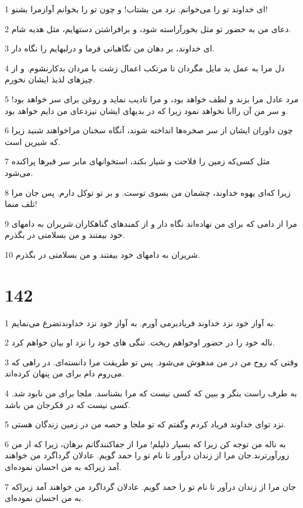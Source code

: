 \par 1 ای خداوند تو را می‌خوانم. نزد من بشتاب! و چون تو را بخوانم آوازمرا بشنو!
\par 2 دعای من به حضور تو مثل بخورآراسته شود، و برافراشتن دستهایم، مثل هدیه شام.
\par 3 ‌ای خداوند، بر دهان من نگاهبانی فرما و درلبهایم را نگاه دار.
\par 4 دل مرا به عمل بد مایل مگردان تا مرتکب اعمال زشت با مردان بدکارنشوم. و از چیزهای لذیذ ایشان نخورم.
\par 5 مرد عادل مرا بزند و لطف خواهد بود، و مرا تادیب نماید و روغن برای سر خواهد بود! و سر من آن راابا نخواهد نمود زیرا که در بدیهای ایشان نیزدعای من دایم خواهد بود.
\par 6 چون داوران ایشان از سر صخره‌ها انداخته شوند، آنگاه سخنان مراخواهند شنید زیرا که شیرین است.
\par 7 مثل کسی‌که زمین را فلاحت و شیار بکند، استخوانهای مابر سر قبرها پراکنده می‌شود.
\par 8 زیرا که‌ای یهوه خداوند، چشمان من بسوی توست. و بر تو توکل دارم. پس جان مرا تلف منما!
\par 9 مرا از دامی که برای من نهاده‌اند نگاه دار و از کمندهای گناهکاران.شریران به دامهای خود بیفتند و من بسلامتی در بگذرم.
\par 10 شریران به دامهای خود بیفتند و من بسلامتی در بگذرم.
 
\chapter{142}

\par 1 به آواز خود نزد خداوند فریادبرمی آورم. به آواز خود نزد خداوندتضرع می‌نمایم.
\par 2 ناله خود را در حضور اوخواهم ریخت. تنگی های خود را نزد او بیان خواهم کرد.
\par 3 وقتی که روح من در من مدهوش می‌شود. پس تو طریقت مرا دانسته‌ای. در راهی که می‌روم دام برای من پنهان کرده‌اند.
\par 4 به طرف راست بنگر و ببین که کسی نیست که مرا بشناسد. ملجا برای من نابود شد. کسی نیست که در فکرجان من باشد.
\par 5 نزد تو‌ای خداوند فریاد کردم وگفتم که تو ملجا و حصه من در زمین زندگان هستی.
\par 6 به ناله من توجه کن زیرا که بسیار ذلیلم! مرا از جفاکنندگانم برهان، زیرا که از من زورآورترند.جان مرا از زندان درآور تا نام تو را حمد گویم. عادلان گرداگرد من خواهند آمد زیراکه به من احسان نموده‌ای.
\par 7 جان مرا از زندان درآور تا نام تو را حمد گویم. عادلان گرداگرد من خواهند آمد زیراکه به من احسان نموده‌ای.
 

